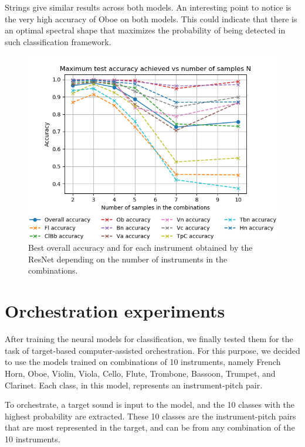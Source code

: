 \documentclass{article}
\begin{document}
Strings give similar results across both models. An interesting point to notice is the very high accuracy of Oboe on both models. This could indicate that there is an optimal spectral shape that maximizes the probability of being detected in such classification framework.

\begin{figure}
\begin{center}
\includegraphics[scale=0.40]{figs/Acc_vs_N_ResNet.png}
\caption{Best overall accuracy and for each instrument obtained by the ResNet depending on the number of instruments in the combinations. \label{best_acc_resnet}}
\end{center}
\end{figure}

\section{Orchestration experiments}
\label{sec:orchestration}

After training the neural models for classification, we finally tested them for the task of target-based computer-assisted orchestration. For this purpose, we decided to use the models trained on combinations of 10 instruments, namely French Horn, Oboe, Violin, Viola, Cello, Flute, Trombone, Bassoon, Trumpet, and Clarinet. Each class, in this model, represents an instrument-pitch pair. 

To orchestrate, a target sound is input to the model, and the 10 classes with the highest probability are extracted. These 10 classes are the instrument-pitch pairs that are most represented in the target, and can be from any combination of the 10 instruments. 
\end{document}
